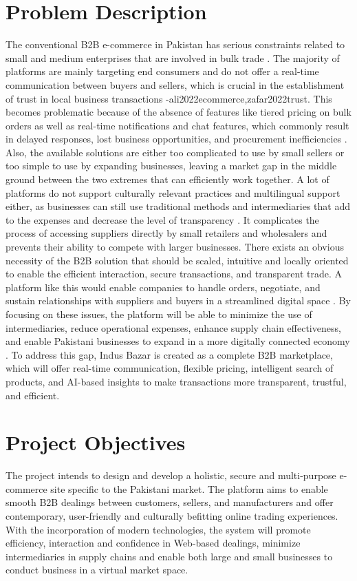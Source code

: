 \section{Problem Description}
The conventional B2B e-commerce in Pakistan has serious constraints related to small and medium enterprises that are involved in bulk trade \cite{han2023digital}. The majority of platforms are mainly targeting end consumers and do not offer a real-time communication between buyers and sellers, which is crucial in the establishment of trust in local business transactions -ali2022ecommerce,zafar2022trust. This becomes problematic because of the absence of features like tiered pricing on bulk orders as well as real-time notifications and chat features, which commonly result in delayed responses, lost business opportunities, and procurement inefficiencies \cite{chaffey2022digital}. Also, the available solutions are either too complicated to use by small sellers or too simple to use by expanding businesses, leaving a market gap in the middle ground between the two extremes that can efficiently work together. A lot of platforms do not support culturally relevant practices and multilingual support either, as businesses can still use traditional methods and intermediaries that add to the expenses and decrease the level of transparency \cite{akram2022user,shaikh2024design}. It complicates the process of accessing suppliers directly by small retailers and wholesalers and prevents their ability to compete with larger businesses. There exists an obvious necessity of the B2B solution that should be scaled, intuitive and locally oriented to enable the efficient interaction, secure transactions, and transparent trade. A platform like this would enable companies to handle orders, negotiate, and sustain relationships with suppliers and buyers in a streamlined digital space \cite{laudon2023ecommerce}. By focusing on these issues, the platform will be able to minimize the use of intermediaries, reduce operational expenses, enhance supply chain effectiveness, and enable Pakistani businesses to expand in a more digitally connected economy \cite{worldbank2023pakistan}. To address this gap, Indus Bazar is created as a complete B2B marketplace, which will offer real-time communication, flexible pricing, intelligent search of products, and AI-based insights to make transactions more transparent, trustful, and efficient.
\section{Project Objectives}
The project intends to design and develop a holistic, secure and multi-purpose e-commerce site specific to the Pakistani market. The platform aims to enable smooth B2B dealings between customers, sellers, and manufacturers and offer contemporary, user-friendly and culturally befitting online trading experiences. With the incorporation of modern technologies, the system will promote efficiency, interaction and confidence in Web-based dealings, minimize intermediaries in supply chains and enable both large and small businesses to conduct business in a virtual market space.

